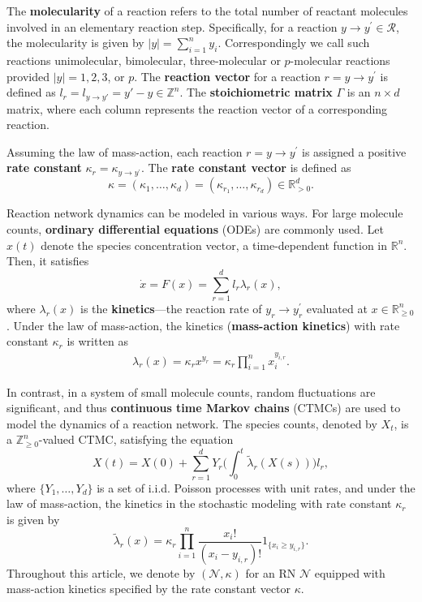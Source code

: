 \documentclass[10pt,a4paper]{amsart}
\theoremstyle{definition}
\theoremstyle{remark}
\theoremstyle{consequence}
\def\p{^{\prime}}
\def\k{\kappa}
\def\cN{\mathcal{N}}
\def\cR{\mathcal{R}}
\def\R{\mathbb{R}}
\def\Z{\mathbb{Z}}
\numberwithin{equation}{section}
\begin{document}
 The \textbf{molecularity} of a reaction refers to the total number of reactant molecules involved in an elementary reaction step.  Specifically, for a reaction $y\to y\p \in\cR$, the molecularity is given by $|y| = \sum\limits_{i=1}^n y_i$. Correspondingly we call such reactions unimolecular, bimolecular, three-molecular or $p$-molecular reactions provided $|y| = 1, 2, 3$, or $p$.
The \textbf{reaction vector} for a reaction $r = y \to y\p$ is defined as $l_r = l_{y \to y'} = y' - y \in \mathbb{Z}^n$. 
The \textbf{stoichiometric matrix} $\Gamma$ is an $n \times d$ matrix, where each column represents the reaction vector of a corresponding reaction.

Assuming the law of mass-action, each reaction $r = y\to y\p$ is assigned a positive  \textbf{rate constant} 
$\k_r = \k_{y\to y\p}$. The \textbf{rate constant vector} is defined as 
\[
  \k = (\k_1,\dots, \k_d) = (\k_{r_1},\dots, \k_{r_d}) \in\R_{>0}^d.
  \]




Reaction network dynamics can be modeled in various ways. For large molecule counts,  \textbf{ordinary differential equations} (ODEs) are commonly used.  Let $x(t)$ denote the species concentration vector, a time-dependent function in $\R^n$. Then, it satisfies
\begin{equation}\label{ode}
\dot{x} = F(x) =  \sum\limits_{r=1}^d l_r \lambda_r(x) , 
\end{equation}
where $\lambda_r(x)$ is the \textbf{kinetics}---the reaction rate of $y_r \to y_r\p$ evaluated at $x \in \mathbb{R}^n_{\geq 0}$. Under the law of mass-action, the kinetics (\textbf{mass-action kinetics}) with rate constant $\k_r$ is written as
\begin{align}\label{def_ma-kinetics}
\lambda_r(x) = \kappa_r x^{y_r} =\kappa_r \prod\limits_{i=1}^n x_i^{y_{i,r}}. 
\end{align}

In contrast, in a system of  small molecule counts, random fluctuations are significant, and thus \textbf{continuous time Markov chains} (CTMCs) are used to model the dynamics of a reaction network. The species counts, denoted by $X_t$, is a $\Z_{\geq 0}^n$-valued CTMC, satisfying the equation
\[
  X(t) = X(0) + \sum_{r = 1}^d Y_{r} \Big(\int_0^t \widetilde{\lambda}_{r} (X(s))\Big) l_r,
\]
where $\{Y_1,\dots, Y_d\}$ is a set of i.i.d. Poisson processes with unit rates, and under the law of mass-action, the kinetics in the stochastic modeling with rate constant $\k_r$ is given by
$$\widetilde{\lambda}_r(x)  = \kappa_r \prod\limits_{i=1}^n \frac{x_i!}{(x_i - y_{i,r})!}1_{\{x_i\geq y_{i,r}\}}.$$
Throughout this article, we denote by $(\cN, \k)$ for an RN $\cN$ equipped with mass-action kinetics specified by the rate constant vector $\k$.
\end{document}
